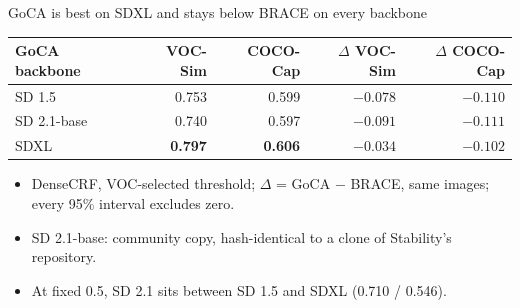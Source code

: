 
\begin{frame}{GoCA is best on SDXL and stays below BRACE on every backbone}
\begin{slidetable}
\begin{tabular}{@{}lrrrr@{}}
\toprule
GoCA backbone & VOC-Sim & COCO-Cap & $\Delta$ VOC-Sim & $\Delta$ COCO-Cap \\
\midrule
SD 1.5 & 0.753 & 0.599 & $-0.078$ & $-0.110$ \\
SD 2.1-base & 0.740 & 0.597 & $-0.091$ & $-0.111$ \\
SDXL & \textbf{0.797} & \textbf{0.606} & $-0.034$ & $-0.102$ \\
\bottomrule
\end{tabular}
\end{slidetable}
\begin{itemize}
\item DenseCRF, VOC-selected threshold; $\Delta$ = GoCA $-$ BRACE, same images; every 95\% interval excludes zero.
\item SD 2.1-base: community copy, hash-identical to a clone of Stability's repository.
\item At fixed 0.5, SD 2.1 sits between SD 1.5 and SDXL (0.710 / 0.546).
\end{itemize}
\end{frame}

